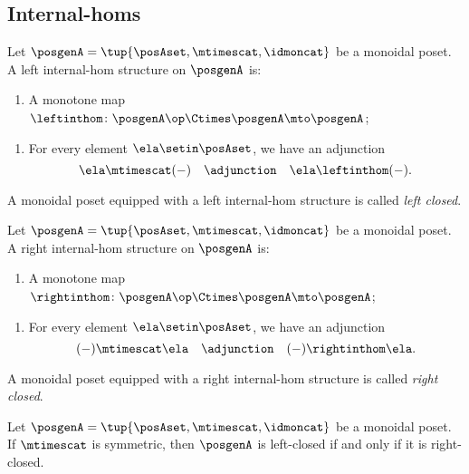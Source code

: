 \subsection{Internal-homs}

\begin{ctdefinition}
Let $\posgenA = \tup{\posAset, \mtimescat, \idmoncat}$ be a monoidal poset. A left internal-hom structure on $\posgenA$ is:

\constit
\begin{enumerate}
\item A monotone map $\leftinthom \colon \posgenA\op \Ctimes \posgenA \mto \posgenA$; 
\end{enumerate}

\condit
\begin{enumerate}
\item For every element $\ela \setin \posAset$, we have an adjunction 
\begin{equation}
\ela \mtimescat ( - ) \quad  \adjunction \quad \ela \leftinthom ( - ).
\end{equation}
\end{enumerate}
A monoidal poset equipped with a left internal-hom structure is called \emph{left closed}.
\end{ctdefinition}

\begin{ctdefinition}
Let $\posgenA = \tup{\posAset, \mtimescat, \idmoncat}$ be a monoidal poset. A right internal-hom structure on $\posgenA$ is:

\constit
\begin{enumerate}
\item A monotone map $\rightinthom \colon \posgenA\op \Ctimes \posgenA \mto \posgenA$; 
\end{enumerate}

\condit
\begin{enumerate}
\item For every element $\ela \setin \posAset$, we have an adjunction 
\begin{equation}
( - ) \mtimescat \ela \quad  \adjunction \quad ( - ) \rightinthom \ela.
\end{equation}
\end{enumerate}
A monoidal poset equipped with a right internal-hom structure is called \emph{right closed}.
\end{ctdefinition}

\begin{lemma}
Let $\posgenA = \tup{\posAset, \mtimescat, \idmoncat}$ be a monoidal poset. If $\mtimescat$ is symmetric, then $\posgenA$ is left-closed if and only if it is right-closed.
\end{lemma}

